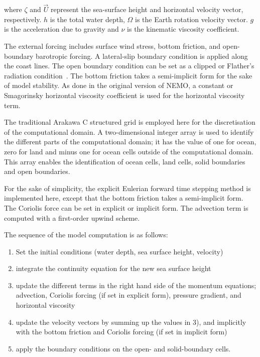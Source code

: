 \documentclass[gmd, manuscript]{copernicus}
\begin{document}
where $\zeta$ and $\vec{U}$ represent the sea-surface height and
horizontal velocity vector, respectively. $h$ is the total water
depth, $\Omega$ is the Earth rotation velocity vector.  $g$ is the
acceleration due to gravity and $\nu$ is the kinematic viscosity coefficient.

The external forcing includes surface wind stress, bottom friction,
and open-boundary barotropic forcing. A lateral-slip boundary
condition is applied along the coast lines. The open boundary
condition can be set as a clipped or Flather's radiation
condition~\citep{flather76}. The bottom friction takes a semi-implicit
form for the sake of model stability. As done in the original version
of NEMO, a constant or Smagorinsky horizontal viscosity coefficient is
used for the horizontal viscosity term.

The traditional Arakawa C structured grid is employed here for the
discretisation of the computational domain. A two-dimensional integer
array is used to identify the different parts of the computational
domain; it has the value of one for ocean, zero for land and minus
one for ocean cells outside of the computational domain. This array
enables the identification of ocean cells, land cells, solid boundaries
and open boundaries.

For the sake of simplicity, the explicit Eulerian forward time
stepping method is implemented here, except that the bottom friction
takes a semi-implicit form.  The Coriolis force can be set in explicit
or implicit form. The advection term is computed with a first-order
upwind scheme.

The sequence of the model computation is as follows:
\begin{enumerate}
\item Set the initial conditions (water depth, sea surface height, velocity)
\item integrate the continuity equation for the new sea surface height
\item update the different terms in the right hand side of the momentum equations; advection, Coriolis forcing (if set in explicit form), pressure gradient, and horizontal viscosity
\item update the velocity vectors by summing up the values in 3), and implicitly with the bottom friction and Coriolis forcing (if set in implicit form)
\item apply the boundary conditions on the open- and solid-boundary cells.
\end{enumerate}
\end{document}
